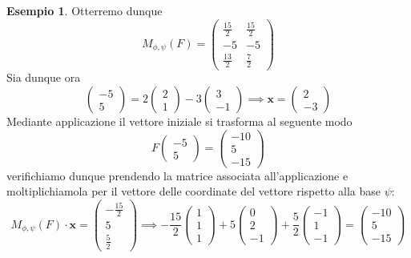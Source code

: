 \documentclass{article}
\theoremstyle{plain}
\theoremstyle{definition}
\newtheorem{exmp}{Esempio}[section]
\theoremstyle{remark}
\begin{document}
\begin{exmp}
    Otterremo dunque
    \[M_{\phi,\psi}(F)=\begin{pmatrix}
        \frac{15}{2}&\frac{15}{2}\\
        -5&-5\\
        \frac{13}{2}&\frac{7}{2}
    \end{pmatrix}\]
    Sia dunque ora 
    \[\begin{pmatrix}-5\\5\end{pmatrix}=2\begin{pmatrix}2\\1\end{pmatrix}-3\begin{pmatrix}3\\-1\end{pmatrix}\implies \mathbf{x}=\begin{pmatrix}2\\-3\end{pmatrix}\]
    Mediante applicazione il vettore iniziale si trasforma al seguente modo
    \[F\begin{pmatrix}-5\\5\end{pmatrix}=\begin{pmatrix}-10\\5\\-15\end{pmatrix}\]
    verifichiamo dunque prendendo la matrice associata all'applicazione e moltiplichiamola per il vettore delle coordinate del vettore rispetto alla base $\psi$:
    \[M_{\phi,\psi}(F)\cdot\mathbf{x}=\begin{pmatrix}-\frac{15}{2}\\5\\\frac{5}{2}\end{pmatrix}\implies
     -\frac{15}{2}\begin{pmatrix}1\\1\\1\end{pmatrix}+5\begin{pmatrix}0\\2\\-1\end{pmatrix}+\frac{5}{2}\begin{pmatrix}-1\\1\\-1\end{pmatrix}=\begin{pmatrix}-10\\5\\-15\end{pmatrix}\] 
\end{exmp}
\end{document}
